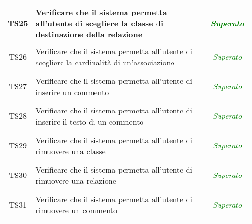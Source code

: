 \begin{longtable}{|c|>{}m{8cm}|c|}
\hypertarget{TS25}{TS25} & Verificare che il sistema permetta all'utente di scegliere la classe di destinazione della relazione & \textcolor{Green}{\textit{Superato}}\\ \hline
\hypertarget{TS26}{TS26} & Verificare che il sistema permetta all'utente di scegliere la cardinalità di un'associazione & \textcolor{Green}{\textit{Superato}}\\ \hline
\hypertarget{TS27}{TS27} & Verificare che il sistema permetta all'utente di inserire un commento & \textcolor{Green}{\textit{Superato}}\\ \hline
\hypertarget{TS28}{TS28} & Verificare che il sistema permetta all'utente di inserire il testo di un commento & \textcolor{Green}{\textit{Superato}}\\ \hline

\hypertarget{TS29}{TS29} & Verificare che il sistema permetta all'utente di rimuovere una classe & \textcolor{Green}{\textit{Superato}}\\ \hline
\hypertarget{TS30}{TS30} & Verificare che il sistema permetta all'utente di rimuovere una relazione & \textcolor{Green}{\textit{Superato}}\\ \hline
\hypertarget{TS31}{TS31} & Verificare che il sistema permetta all'utente di rimuovere un commento & \textcolor{Green}{\textit{Superato}}\\ \hline


\end{longtable}
